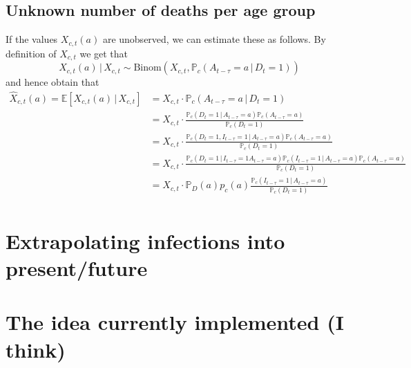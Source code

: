 \documentclass[a4paper]{article}
\renewcommand\P{\mathbb{P}}
\newcommand\E{\mathbb{E}}
\newcommand{\given}{\, \vert \,}
\begin{document}
\subsection{Unknown number of deaths per age group}
%
If the values $X_{c,t}(a)$ are unobserved, we can estimate these as follows. By definition of $X_{c,t}$ we get that
$$X_{c,t}(a) \given X_{c,t} \sim \text{Binom}(X_{c,t}, \P_c(A_{t-\tau} = a \given D_{t} = 1))$$
and hence obtain that
\begin{align*}
\hat{X}_{c,t}(a) = \E[X_{c,t}(a) \given X_{c,t}] 	&= X_{c,t} \cdot \P_c(A_{t-\tau} = a \given D_{t} = 1) \\
																		&= X_{c,t} \cdot \frac{\P_c(D_t = 1 \given A_{t-\tau} = a) \P_c(A_{t-\tau} = a)}{\P_c(D_t = 1)} \\
																		&= X_{c,t} \cdot \frac{\P_c(D_t = 1, I_{t-\tau} = 1 \given A_{t-\tau} = a) \P_c(A_{t-\tau} = a)}{\P_c(D_t = 1)} \\
																		&= X_{c,t} \cdot \frac{\P_c(D_t = 1\given I_{t-\tau} = 1 A_{t-\tau} = a) \P_c(I_{t-\tau} = 1 \given A_{t-\tau} = a) \P_c(A_{t-\tau} = a)}{\P_c(D_t = 1)} \\
																		&= X_{c,t} \cdot \P_D(a) p_c(a) \frac{\P_c(I_{t-\tau} = 1 \given A_{t-\tau} = a) }{\P_c(D_t = 1)} \\
\end{align*}

\section{Extrapolating infections into present/future}


\section{The idea currently implemented (I think)}
\end{document}
